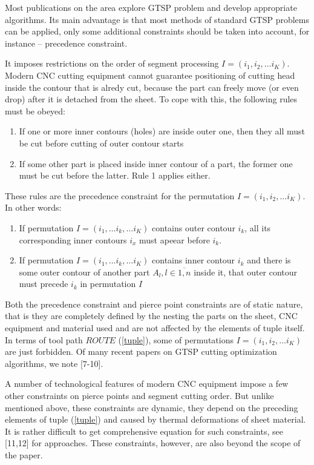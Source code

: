 \documentclass{ifacconf}
\begin{document}
Most publications on the area explore GTSP problem
and develop appropriate algorithms.
Its main advantage is that most methods
of standard GTSP problems can be applied,
only some additional constraints should be
taken into account,
for instance -- precedence constraint.

It imposes restrictions on the order of
segment processing
$I = (i_1, i_2, \dots i_K)$.
Modern CNC cutting equipment cannot guarantee
positioning of cutting head inside the contour
that is alredy cut,
because the part can freely move
(or even drop)
after it is detached from the sheet.
To cope with this,
the following rules must be obeyed:

\begin{enumerate}
    \item{If one or more inner contours (holes) are inside outer one,
    then they all must be cut before cutting of outer contour starts
    }
    \item{If some other part is placed inside
    inner contour of a part,
    the former one must be cut before the latter.
    Rule 1 applies either.}
\end{enumerate}
These rules are the precedence constraint
for the permutation
$I = (i_1, i_2, \dots i_K)$.
In other words:
\begin{enumerate}
    \item{If permutation
    $I = (i_1, \dots i_k, \dots i_K)$
    contains outer contour $i_k$,
    all its corresponding inner contours $i_x$
    must apeear before $i_k$.
    }
    \item{If permutation
    $I = (i_1, \dots i_k, \dots i_K)$
    contains inner contour $i_k$
    and there is some outer contour
    of another part $A_l, l \in \overline{1,n}$
    inside it,
    that outer contour must precede $i_k$
    in permutation $I$}
\end{enumerate}

Both the precedence constraint
and pierce point constraints
are of static nature,
that is they are completely defined by
the nesting the parts on the sheet,
CNC equipment and material used
and are not affected by the elements
of tuple itself.
In terms of tool path $ROUTE$
(\ref{tuple}),
some of permutations
$I = (i_1, i_2, \dots i_K)$
are just forbidden.
Of many recent papers
on GTSP cutting optimization algorithms,
we note [7-10].

A number of technological features of modern CNC equipment
impose a few other constraints on
pierce points and segment cutting order.
But unlike mentioned above,
these constraints are dynamic,
they depend on the preceding elements
of tuple (\ref{tuple})
and caused by
thermal deformations of sheet material.
It is rather difficult to get comprehensive
equation for such constraints,
see [11,12] for approaches.
These constraints, however,
are also beyond the scope of the paper.
\end{document}

